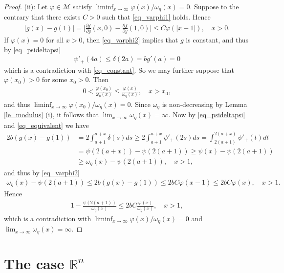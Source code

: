 \documentclass[10pt,a4paper]{amsart}
\theoremstyle{definition}
\newcommand{\R}{\mathbb{R}}
\newcommand{\M}{\mathcal{M}}
\begin{document}
\begin{proof}
(ii): Let $ \varphi\in\M $ satisfy $ \liminf_{x\to\infty}\varphi(x)/\omega_{\eta}(x)=0 $. Suppose to the contrary that there exists $ C>0 $ such that \eqref{eq_varphi1} holds. Hence
\begin{align}\label{eq_varphi2}
\vert g(x)-g(1)\vert=\bigg\vert\frac{\partial f}{\partial y}(x,0)-\frac{\partial f}{\partial y}(1,0)\bigg\vert\leq C\varphi(\vert x-1\vert),\quad x>0.
\end{align}
If $ \varphi(x)=0 $ for all $ x>0 $, then \eqref{eq_varphi2} implies that $ g $ is constant, and thus by \eqref{eq_psideltapsi}
\begin{align*}
\psi'_+(4a)\leq\delta(2a)=bg'(a)=0
\end{align*}
which is a contradiction with \eqref{eq_constant}. So we may further suppose that $ \varphi(x_0)>0 $ for some $ x_0>0 $. Then
\begin{align*}
0<\frac{\varphi(x_0)}{\omega_{\eta}(x)}\leq\frac{\varphi(x)}{\omega_{\eta}(x)},\quad x>x_0,
\end{align*}
and thus $ \liminf_{x\to\infty}\varphi(x_0)/\omega_{\eta}(x)=0 $. Since $ \omega_{\eta} $ is non-decreasing by Lemma \ref{le_modulus} (i), it follows that $ \lim_{x\to\infty}\omega_{\eta}(x)=\infty $. Now by \eqref{eq_psideltapsi} and \eqref{eq_equivalent} we have
\begin{align*}
2b(g(x)-g(1))&=2\int_{a+1}^{a+x}\delta(s)ds\geq 2\int_{a+1}^{a+x}\psi'_+(2s)ds=\int_{2(a+1)}^{2(a+x)}\psi'_+(t)dt\\
&=\psi(2(a+x))-\psi(2(a+1))\geq\psi(x)-\psi(2(a+1))\\
&\geq\omega_{\eta}(x)-\psi(2(a+1)),\quad x>1,
\end{align*}
and thus by \eqref{eq_varphi2}
\begin{align*}
\omega_{\eta}(x)-\psi(2(a+1))\leq 2b(g(x)-g(1))\leq 2bC\varphi(x-1)\leq 2bC\varphi(x),\quad x>1.
\end{align*}
Hence
\begin{align*}
1-\frac{\psi(2(a+1))}{\omega_{\eta}(x)}\leq 2bC\frac{\varphi(x)}{\omega_{\eta}(x)},\quad x>1,
\end{align*}
which is a contradiction with $ \liminf_{x\to\infty}\varphi(x)/\omega_{\eta}(x)=0 $ and $ \lim_{x\to\infty}\omega_{\eta}(x)=\infty $.
\end{proof}

\section{The case $ \R^n $}
\end{document}

